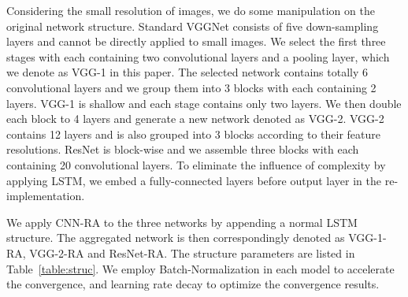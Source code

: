 \documentclass[runningheads]{llncs}
\begin{document}
Considering the small resolution of images, we do some manipulation on the original network structure. Standard VGGNet consists of five down-sampling layers and cannot be directly applied to small images. We select the first three stages with each containing two convolutional layers and a pooling layer, which we denote as VGG-1 in this paper. The selected network contains totally 6 convolutional layers and we group them into 3 blocks with each containing 2 layers. VGG-1 is shallow and each stage contains only two layers. We then double each block to 4 layers and generate a new network denoted as VGG-2. VGG-2 contains 12 layers and is also grouped into 3 blocks according to their feature resolutions. ResNet is block-wise and we assemble three blocks with each containing 20 convolutional layers. To eliminate the influence of complexity by applying LSTM, we embed a fully-connected layers before output layer in the re-implementation.

We apply CNN-RA to the three networks by appending a normal LSTM structure. The aggregated network is then correspondingly denoted as VGG-1-RA, VGG-2-RA and ResNet-RA. The structure parameters are listed in Table~\ref{table:struc}. We employ Batch-Normalization in each model to accelerate the convergence, and learning rate decay to optimize the convergence results.
\end{document}
